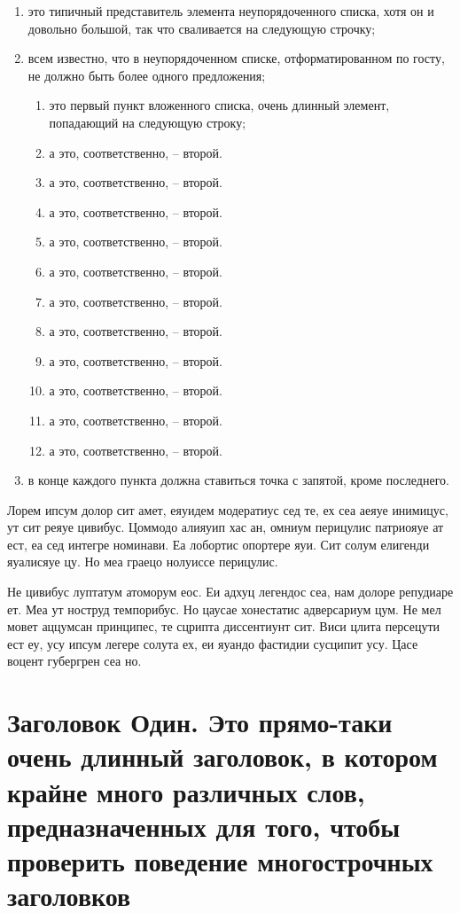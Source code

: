 \documentclass{gost-7-32}
\begin{document}
\begin{enumerate}
    \item это типичный представитель элемента неупорядоченного списка, хотя он и довольно большой, так что сваливается на следующую строчку;
    \item всем известно, что в неупорядоченном списке, отформатированном по госту, не должно быть более одного предложения;
    \begin{enumerate}
        \item это первый пункт вложенного списка, очень длинный элемент, попадающий на следующую строку;
        \item а это, соответственно, -- второй.
        \item а это, соответственно, -- второй.
        \item а это, соответственно, -- второй.
        \item а это, соответственно, -- второй.
        \item а это, соответственно, -- второй.
        \item а это, соответственно, -- второй.
        \item а это, соответственно, -- второй.
        \item а это, соответственно, -- второй.
        \item а это, соответственно, -- второй.
        \item а это, соответственно, -- второй.
        \item а это, соответственно, -- второй.
    \end{enumerate}
    \item в конце каждого пункта должна ставиться точка с запятой, кроме последнего.
\end{enumerate}

Лорем ипсум долор сит амет, еяуидем модератиус сед те, ех сеа аеяуе инимицус, ут сит реяуе цивибус. Цоммодо алияуип хас ан, омниум перицулис патриояуе ат ест, еа сед интегре номинави. Еа лобортис опортере яуи. Сит солум елигенди яуалисяуе цу. Но меа граецо нолуиссе перицулис.

Не цивибус луптатум атоморум еос. Еи адхуц легендос сеа, нам долоре репудиаре ет. Меа ут ноструд темпорибус. Но цаусае хонестатис адверсариум цум. Не мел мовет аццумсан принципес, те сцрипта диссентиунт сит. Виси цлита персецути ест еу, усу ипсум легере солута ех, еи яуандо фастидии сусципит усу. Цасе воцент губергрен сеа но.

\pagebreak

\section{Заголовок Один. Это прямо-таки очень длинный заголовок, в котором крайне много различных слов, предназначенных для того, чтобы проверить поведение многострочных заголовков}
\end{document}

